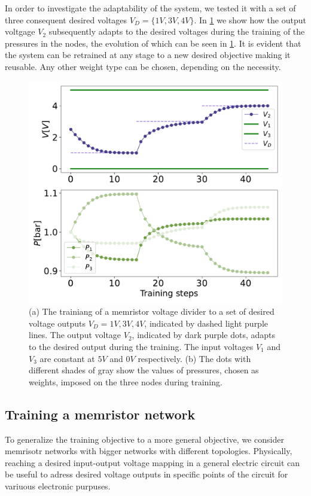 \documentclass[reprint,superscriptaddress,prb,showkeys]{revtex4-2}
\begin{document}
In order to investigate the adaptability of the system, we tested it with a set of three consequent desired voltages $V_D=\{1V, 3V, 4V\}$. In \cref{fig:evolution_targets} we show how the output voltgage $V_2$ subsequently adapts to the desired voltages during the training of the pressures in the nodes, the evolution of which can be seen in \cref{fig:evolution_targets}. It is evident that the system can be retrained at any stage to a new desired objective making it reusable. Any other weight type can be chosen, depending on the necessity.  

\begin{figure}[h]
    \centering
    \includegraphics[width=0.8\columnwidth]{plots/voltage_divider/evolution_targets.pdf}
    \caption{(a) The trainiang of a memristor voltage divider to a set of desired voltage outputs $V_D = {1V, 3V, 4V}$, indicated by dashed light purple lines. The output voltage $V_2$, indicated by dark purple dots, adapts to the desired output during the training. The input voltages $V_1$ and $V_3$ are constant at $5V$ and $0V$ respectively. (b) The dots with different shades of gray show the values of pressures, chosen as weights, imposed on the three nodes during training.}\label{fig:evolution_targets}
\end{figure}

\subsection{Training a memristor network}

To generalize the training objective to a more general objective, we consider memrisotr networks with bigger networks with different topologies. Physically, reaching a desired input-output voltage mapping in a general electric circuit can be useful to adress desired voltage outputs in specific points of the circuit for variuous electronic purpuses. 
\end{document}
